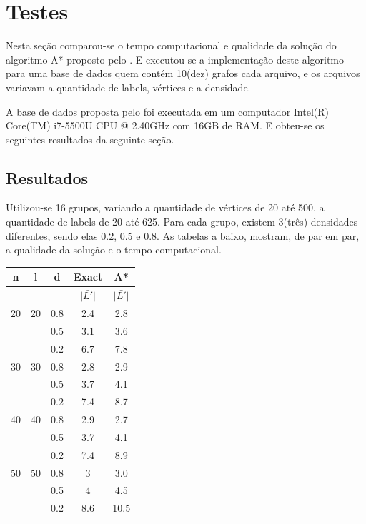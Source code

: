 \documentclass[12pt]{article}
\begin{document}
\section{Testes}\label{sec:testes}
	
	Nesta seção comparou-se o tempo computacional e qualidade da solução do algoritmo A* proposto pelo \cite{chang:1996}. E executou-se a implementação deste algoritmo para uma base de dados quem contém 10(dez) grafos cada arquivo, e os arquivos variavam a quantidade de labels, vértices e a densidade.

	A base de dados proposta pelo \cite{consoli:2009} foi executada em um computador Intel(R) Core(TM) i7-5500U CPU @ 2.40GHz com 16GB de RAM. E obteu-se os seguintes resultados da seguinte seção.

	\subsection{Resultados}\label{sec:resultados}
		
		Utilizou-se 16 grupos, variando a quantidade de vértices de 20 até 500, a quantidade de labels de 20 até 625. Para cada grupo, existem 3(três) densidades diferentes, sendo elas 0.2, 0.5 e 0.8. As tabelas a baixo, mostram, de par em par, a qualidade da solução e o tempo computacional.

		\begin{tabular}{c|c|c|c|c} \hline
			n & l & d & Exact & A* \\ \hline
			& & & $\bar{|L'|}$ & $\bar{|L'|}$ \\ \hline
			20 & 20 & 0.8 & 2.4 & 2.8\\
			 &  & 0.5 & 3.1 & 3.6\\
			 &  & 0.2 & 6.7 & 7.8\\ \hline
			30 & 30 & 0.8 & 2.8 & 2.9 \\
			 &  & 0.5 & 3.7 & 4.1\\
			 &  & 0.2 & 7.4 & 8.7\\ \hline
			40 & 40 & 0.8 & 2.9 & 2.7\\
			 &  & 0.5 & 3.7 & 4.1\\
			 &  & 0.2 & 7.4 & 8.9\\ \hline
			50 & 50 & 0.8 & 3 & 3.0\\
			 &  & 0.5 & 4 & 4.5\\
			 &  & 0.2 & 8.6 & 10.5\\ \hline
		\end{tabular}

		\vspace{2cm}
\end{document}
